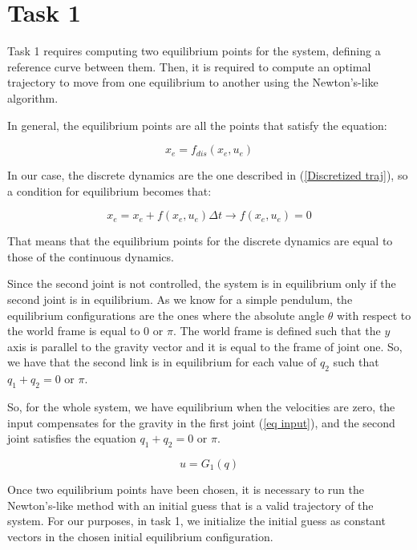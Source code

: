 \chapter*{Task 1}

Task 1 requires computing two equilibrium points for the system, defining a reference curve between them. Then, it is required to compute an optimal trajectory to move from one equilibrium to another using the Newton's-like algorithm.

In general, the equilibrium points are all the points that satisfy the equation:

\begin{equation}
    x_{e} = f_{dis}(x_e,u_e)
\end{equation}

In our case, the discrete dynamics are the one described in (\ref{Discretized traj}), so a condition for equilibrium becomes that:

\begin{equation}
    x_e = x_e + f(x_e,u_e)\Delta t \longrightarrow f(x_e,u_e) = 0
\end{equation}

That means that the equilibrium points for the discrete dynamics are equal to those of the continuous dynamics.

Since the second joint is not controlled, the system is in equilibrium only if the second joint is in equilibrium. As we know for a simple pendulum, the equilibrium configurations are the ones where the absolute angle $\theta$ with respect to the world frame is equal to 0 or $\pi$. The world frame is defined such that the $y$ axis is parallel to the gravity vector and it is equal to the frame of joint one. So, we have that the second link is in equilibrium for each value of $q_2$ such that $q_1 + q_2 = 0 \text{ or } \pi$.

So, for the whole system, we have equilibrium when the velocities are zero, the input compensates for the gravity in the first joint (\ref{eq input}), and the second joint satisfies the equation $q_1 + q_2 = 0 \text{ or } \pi$.

\begin{equation} \label{eq input}
    u = G_1(q)
\end{equation}

Once two equilibrium points have been chosen, it is necessary to run the Newton's-like method with an initial guess that is a valid trajectory of the system. For our purposes, in task 1, we initialize the initial guess as constant vectors in the chosen initial equilibrium configuration.

